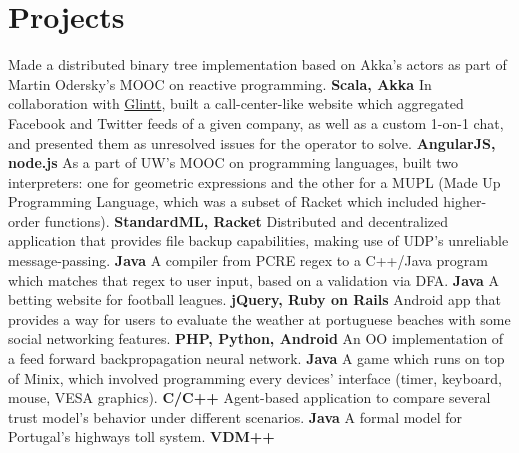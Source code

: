 \documentclass[11pt,a4paper]{moderncv}
\begin{document}
\section{Projects}
{Made a distributed binary tree implementation based on Akka's actors as part of Martin Odersky's MOOC on reactive programming. \textbf{Scala, Akka}}
{In collaboration with \href{http://www.glintt.com/}{Glintt}, built a call-center-like website which aggregated Facebook and Twitter feeds of a given company, as well as a custom 1-on-1 chat, and presented them as unresolved issues for the operator to solve.  \textbf{AngularJS, node.js}}
{As a part of UW's MOOC on programming languages, built two interpreters: one for geometric expressions and the other for a MUPL (Made Up Programming Language, which was a subset of Racket which included higher-order functions). \textbf{StandardML, Racket}}
{Distributed and decentralized application that provides file backup capabilities, making use of UDP's unreliable message-passing. \textbf{Java}}
{A compiler from PCRE regex to a C++/Java program which matches that regex to user input, based on a validation via DFA. \textbf{Java}}
{A betting website for football leagues. \textbf{jQuery, Ruby on Rails}}
{Android app that provides a way for users to evaluate the weather at portuguese beaches with some social networking features. \textbf{PHP, Python, Android}}
{An OO implementation of a feed forward backpropagation neural network. \textbf{Java}}
{A game which runs on top of Minix, which involved programming every devices' interface (timer, keyboard, mouse, VESA graphics). \textbf{C/C++}}
{Agent-based application to compare several trust model's behavior under different scenarios. \textbf{Java}}
{A formal model for Portugal's highways toll system. \textbf{VDM++}}

\end{document}
